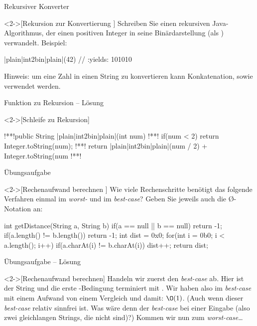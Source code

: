 \begin{frame}[fragile,c]{Rekursiver Konverter}
    \begin{exercise}<2->[Rekursion zur Konvertierung ]
        \pause{}Schreiben Sie einen rekursiven Java-Algorithmus, der einen positiven Integer in seine Binärdarstellung (als ) verwandelt. Beispiel:\pause{}
\begin{plainjava}
|plain|int2bin|plain|(42) // :yields: 101010
\end{plainjava}
    \pause{}Hinweis: um eine Zahl in einen String zu konvertieren kann Konkatenation,\pause{} sowie  verwendet werden.
    \end{exercise}
\end{frame}

\begin{frame}[fragile,c]{Funktion zu Rekursion -- Lösung}
    \begin{solve}<2->[Schleife zu Rekursion]
\begin{plainjava}
!**!public String |plain|int2bin|plain|(int num){
!**!    if(num < 2) return Integer.toString(num);
!**!    return |plain|int2bin|plain|(num / 2) + Integer.toString(num %
!**!}
\end{plainjava}
    \end{solve}
\end{frame}

\begin{frame}[fragile,c]{Übungsaufgabe}
    \begin{exercise}<2->[Rechenaufwand berechnen ]
        \pause{}Wie viele Rechenschritte benötigt das folgende Verfahren einmal im \emph{worst-} und im \emph{best-case}? Geben Sie jeweils auch die \O-Notation an: \pause{}
\begin{plainjava}
int getDistance(String a, String b){
    if(a == null || b == null) return -1;
    if(a.length() != b.length()) return -1;
    int dist = 0x0;
    for(int i = 0b0; i < a.length(); i++)
        if(a.charAt(i) != b.charAt(i))
            dist++;
    return dist;
}
\end{plainjava}
    \end{exercise}
\end{frame}

\begin{frame}[c]{Übungsaufgabe -- Lösung}
    \begin{solve}<2->[Rechenaufwand berechnen]
    \pause{}Handeln wir zuerst den \emph{best-case} ab.\pause{} Hier ist der String   und die erste -Bedingung terminiert mit .\pause{} Wir haben also im \emph{best-case} mit einem Aufwand von einem Vergleich und damit: \(\O(1)\).\pause{} (Auch wenn dieser \emph{best-case} relativ sinnfrei ist.\pause{} Was wäre denn der \emph{best-case} bei einer  Eingabe\pause{} (also zwei gleichlangen Strings, die nicht  sind)?)\pause{} Kommen wir nun zum \emph{worst-case}\ldots
    \end{solve}
\end{frame}


